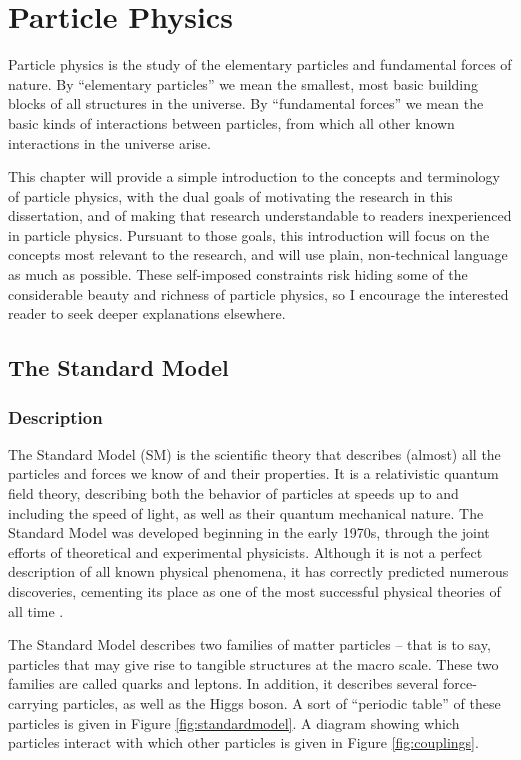 \chapter{Particle Physics}
\label{chap:particlephysics}

Particle physics is the study of the elementary particles and fundamental forces
of nature. By ``elementary particles'' we mean the smallest, most
basic building blocks of all structures in the universe. By
``fundamental forces'' we mean the basic kinds of interactions between
particles, from which all other known interactions in the universe
arise.

This chapter will provide a simple introduction to the concepts
and terminology of particle physics, with the dual goals of motivating the
research in this dissertation, and of making that research understandable to
readers inexperienced in particle physics. Pursuant to those
goals, this introduction will focus on the concepts most relevant to
the research, and will use plain, non-technical language as much as
possible. These self-imposed constraints risk hiding some of the
considerable beauty and richness of particle physics, so I encourage the
interested reader to seek deeper explanations elsewhere.

\section{The Standard Model}
\label{sec:standardmodel}

\subsection{Description}
\label{ssec:SMdescription}

The Standard Model (SM) is the scientific theory that describes
(almost) all the particles and forces we know of and their properties.
It is a relativistic quantum field theory, describing both the
behavior of particles at speeds up to and including the speed of
light, as well as their quantum mechanical nature.
The Standard Model was developed beginning in the early 1970s,
through the joint efforts of theoretical and experimental physicists.
Although it is not a perfect description of all known physical
phenomena, it has correctly predicted numerous discoveries,
cementing its place as one of the most
successful physical theories of all time \cite{griffiths,smcoffee}.

The Standard Model describes two families of matter particles -- that is
to say, particles that may give rise to tangible structures at the macro scale.
These two families are called quarks and leptons. In addition, it
describes several force-carrying particles, as well as the Higgs
boson. A sort of ``periodic table'' of these particles is given in
Figure \ref{fig:standardmodel}. A diagram showing which particles
interact with which other particles is given in Figure \ref{fig:couplings}.

